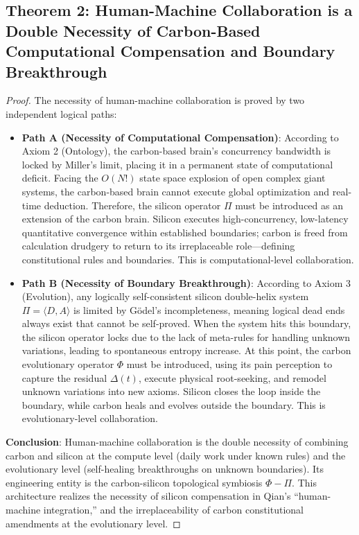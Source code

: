 \documentclass{article}
\begin{document}
\subsection*{Theorem 2: Human-Machine Collaboration is a Double Necessity of Carbon-Based Computational Compensation and Boundary Breakthrough}
\begin{proof}
The necessity of human-machine collaboration is proved by two independent logical paths:
\begin{itemize}
    \item \textbf{Path A (Necessity of Computational Compensation)}: According to Axiom 2 (Ontology), the carbon-based brain's concurrency bandwidth is locked by Miller's limit, placing it in a permanent state of computational deficit. Facing the $O(N!)$ state space explosion of open complex giant systems, the carbon-based brain cannot execute global optimization and real-time deduction. Therefore, the silicon operator $\Pi$ must be introduced as an extension of the carbon brain. Silicon executes high-concurrency, low-latency quantitative convergence within established boundaries; carbon is freed from calculation drudgery to return to its irreplaceable role---defining constitutional rules and boundaries. This is computational-level collaboration.
    \item \textbf{Path B (Necessity of Boundary Breakthrough)}: According to Axiom 3 (Evolution), any logically self-consistent silicon double-helix system $\Pi=\langle D, A \rangle$ is limited by G\"odel's incompleteness, meaning logical dead ends always exist that cannot be self-proved. When the system hits this boundary, the silicon operator locks due to the lack of meta-rules for handling unknown variations, leading to spontaneous entropy increase. At this point, the carbon evolutionary operator $\Phi$ must be introduced, using its pain perception to capture the residual $\Delta(t)$, execute physical root-seeking, and remodel unknown variations into new axioms. Silicon closes the loop inside the boundary, while carbon heals and evolves outside the boundary. This is evolutionary-level collaboration.
\end{itemize}
\textbf{Conclusion}: Human-machine collaboration is the double necessity of combining carbon and silicon at the compute level (daily work under known rules) and the evolutionary level (self-healing breakthroughs on unknown boundaries). Its engineering entity is the carbon-silicon topological symbiosis $\Phi - \Pi$. This architecture realizes the necessity of silicon compensation in Qian's ``human-machine integration,'' and the irreplaceability of carbon constitutional amendments at the evolutionary level.
\end{proof}
\end{document}
